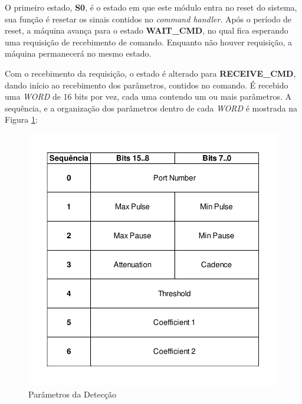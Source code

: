 \documentclass[monografia]{subfiles}
\begin{document}
			O primeiro estado, \textbf{S0}, é o estado em que este módulo entra no reset do sistema, sua função é resetar os sinais contidos no 
			\textit{command handler}. Após o período de reset, a máquina avança para o estado  \textbf{WAIT\_CMD}, no qual 			
			fica esperando uma requisição de recebimento de comando. Enquanto não houver requisição, a máquina permanecerá no mesmo estado.

			Com o recebimento da requisição, o estado é alterado para \textbf{RECEIVE\_CMD}, dando início ao recebimento dos parâmetros, 
			contidos no comando. É recebido uma \textit{WORD} de 16 bits por vez, cada uma contendo um ou mais parâmetros. 
			A sequência, e a organização dos parâmetros dentro de cada \textit{WORD} é mostrada na 
			Figura \ref{fig:detectionParameters}:

				\begin{figure}[!h]
				\centering 
				\includegraphics[scale=0.9]{img/memoryStructs/cmdBuffer.pdf}
				\caption{Parâmetros da Detecção}
				\label{fig:detectionParameters}
				\end{figure}
\end{document}
